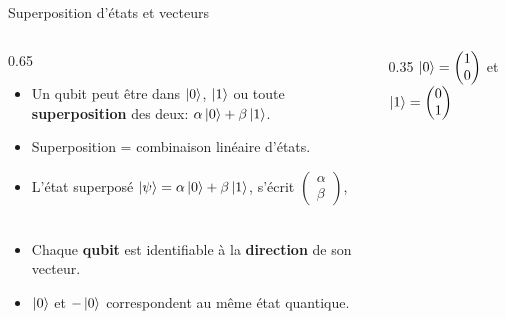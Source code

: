 \documentclass[aspectratio=169,12pt]{beamer}
\begin{document}
\begin{frame}{Superposition d'états et vecteurs}
  \begin{columns}[T]
    \begin{column}{0.65\textwidth}
      \begin{itemize}[<+->]
        \item Un qubit peut être dans $\ket 0$, $\ket 1$ ou toute \textbf{superposition} des deux: $\alpha \ket 0 + \beta \ket 1$.
        \item Superposition = combinaison linéaire d'états.
        \item L'état superposé $\ket {\psi} = \alpha \ket 0 + \beta \ket 1$, s'écrit $\begin{pmatrix} \alpha \\ \beta \end{pmatrix}$,\\~\\
        \item Chaque \textbf{qubit} est identifiable à la \textbf{direction} de son vecteur.
        \item $\ket{0}$ et $-\ket{0}$ correspondent au même état quantique.
      \end{itemize}
    \end{column}
    \begin{column}{0.35\textwidth}
      \vspace{2em}
      \centering
      $\ket 0 = \begin{pmatrix}1 \\ 0\end{pmatrix}$ et $\ket 1 = \begin{pmatrix}0 \\ 1\end{pmatrix}$\\~\\~\\
    \end{column}
  \end{columns}
\end{frame}
\end{document}
